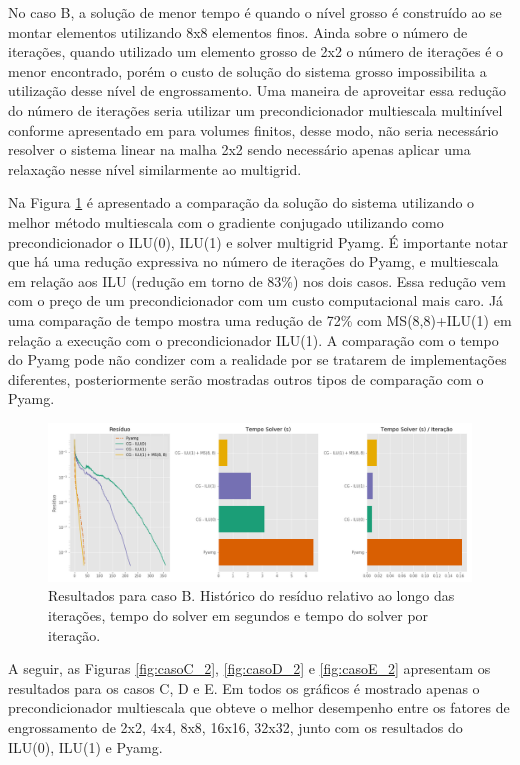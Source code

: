 No caso B, a solução de menor tempo é quando o nível grosso é construído ao se montar elementos utilizando 8x8 elementos finos. Ainda sobre o número de iterações, quando utilizado um elemento grosso de 2x2 o número de iterações é o menor encontrado, porém o custo de solução do sistema grosso impossibilita a utilização desse nível de engrossamento. Uma maneira de aproveitar essa redução do número de iterações seria utilizar um precondicionador multiescala multinível conforme apresentado em \cite{multilevel} para volumes finitos, desse modo, não seria necessário resolver o sistema linear na malha 2x2 sendo necessário apenas aplicar uma relaxação nesse nível similarmente ao multigrid.

Na Figura \ref{fig:reservatorio320x320_2} é apresentado a comparação da solução do sistema utilizando o melhor método multiescala com o gradiente conjugado utilizando como precondicionador o ILU(0), ILU(1) e solver multigrid Pyamg. É importante notar que há uma redução expressiva no número de iterações do Pyamg, e multiescala em relação aos ILU (redução em torno de 83\%) nos dois casos. Essa redução vem com o preço de um precondicionador com um custo computacional mais caro. Já uma comparação de tempo mostra uma redução de 72\% com MS(8,8)+ILU(1) em relação a execução com o precondicionador ILU(1). A comparação com o tempo do Pyamg pode não condizer com a realidade por se tratarem de implementações diferentes, posteriormente serão mostradas outros tipos de comparação com o Pyamg.




\begin{figure}[!htbp]
\centering
\includegraphics[width=\textwidth]{chap08/figs/reservatorio320x320_2.png}
\caption{Resultados para caso B. Histórico do resíduo relativo ao longo das iterações, tempo do solver em segundos e tempo do solver por iteração. }
\label{fig:reservatorio320x320_2}
\end{figure}


A seguir, as Figuras \ref{fig:casoC_2}, \ref{fig:casoD_2} e \ref{fig:casoE_2} apresentam os resultados para os casos C, D e E. 
Em todos os gráficos é mostrado apenas o precondicionador multiescala que obteve o melhor desempenho entre os fatores de engrossamento de 2x2, 4x4, 8x8, 16x16, 32x32,  junto com os resultados do ILU(0), ILU(1) e Pyamg.




